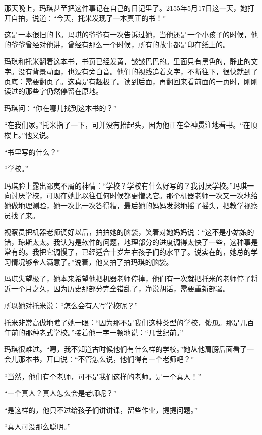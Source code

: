 \documentclass[12pt,UTF-8,openany]{ctexbook}
\begin{document}
\begin{large}
    
    那天晚上，玛琪甚至把这件事记在自己的日记里了。2155年5月17日这一天，她打开自拍，说道：“今天，托米发现了一本真正的书！”
    
    这是一本很旧的书。玛琪的爷爷有一次告诉过她，当他还是一个小孩子的时候，他的爷爷曾经对他讲，曾经有那么一个时候，所有的故事都是印在纸上的。
    
    玛琪和托米翻着这本书，书页已经发黄，皱皱巴巴的。里面只有黑色的，静止的文字。没有背景动画，也没有旁白音。他们的视线追着文字，不断往下，很快就到了页底：需要翻页了。这真是有趣极了。读到后面，再翻回来看前面的一页时，刚刚读过的那些字仍然停留在原地。
    
    玛琪问：“你在哪儿找到这本书的？”
    
    “在我们家。”托米指了一下，可并没有抬起头，因为他正在全神贯注地看书。“在顶楼上。”他又说。
    
    “书里写的什么？”
    
    “学校。”
    
    玛琪脸上露出鄙夷不屑的神情：“学校？学校有什么好写的？我讨厌学校。”玛琪一向讨厌学校，可现在她比以往任何时候都更憎恶它。那个机器老师一次又一次地给她做地理测验，她一次比一次答得糟，最后她的妈妈发愁地摇了摇头，把教学视察员找了来。
    
    视察员把机器老师调好以后，拍拍她的脑袋，笑着对她妈妈说：“这不是小姑娘的错，琼斯太太。我认为是软件的问题，地理部分的进度调得太快了一些，这种事是常有的。我把它调慢了，已经适合十岁左右孩子们的水平了。说实在的，她总的学习情况够令人满意了。”说着，他又拍了拍玛琪的脑袋。
    
    玛琪失望极了，她本来希望他把机器老师停掉，他们有一次就把托米的老师停了将近一个月之久，因为历史那部分完全错乱了，净说胡话，需要重新部署。
    
    所以她对托米说：“怎么会有人写学校呢？”
    
    托米非常高傲地瞧了她一眼：“因为那不是我们这种类型的学校，傻瓜。那是几百年前的那种老式学校。”接着他一字一顿地说：“几世纪前。”
    
    玛琪很难过。“嗯，我不知道古时候他们有什么样的学校。”她从他肩膀后面看了一会儿那本书，开口说：“不管怎么说，他们得有一个老师吧？”
    
    “当然，他们有个老师，可不是我们这样的老师。是一个真人！”
    
    “一个真人？真人怎么会是老师呢？”
    
    “是这样的，他只不过给孩子们讲讲课，留些作业，提提问题。”
    
    “真人可没那么聪明。”
    

\end{large}
\end{document}
